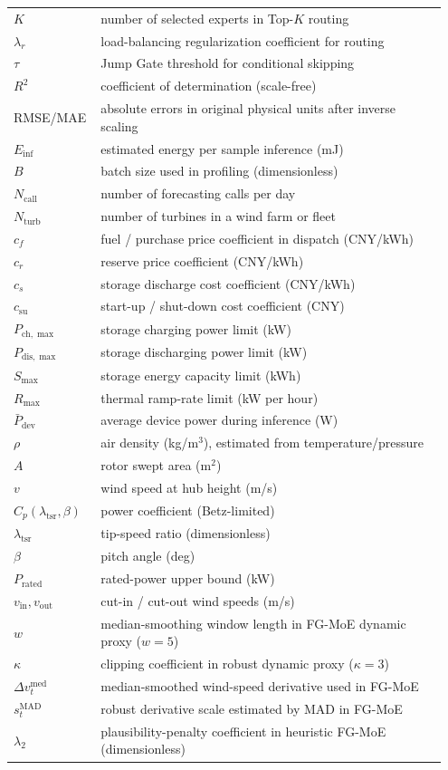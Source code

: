 \documentclass[review,1p,times]{elsarticle}
\begin{document}
\begin{longtable}{@{}p{0.17\linewidth}L{0.78\linewidth}@{}}
$K$ & number of selected experts in Top-$K$ routing \\
$\lambda_r$ & load-balancing regularization coefficient for routing \\
$\tau$ & Jump Gate threshold for conditional skipping \\
$R^2$ & coefficient of determination (scale-free) \\
RMSE/MAE & absolute errors in original physical units after inverse scaling \\
$E_{\text{inf}}$ & estimated energy per sample inference (mJ) \\
$B$ & batch size used in profiling (dimensionless) \\
$N_{\text{call}}$ & number of forecasting calls per day \\
$N_{\text{turb}}$ & number of turbines in a wind farm or fleet \\
$c_f$ & fuel / purchase price coefficient in dispatch (CNY/kWh) \\
$c_r$ & reserve price coefficient (CNY/kWh) \\
$c_s$ & storage discharge cost coefficient (CNY/kWh) \\
$c_{\text{su}}$ & start-up / shut-down cost coefficient (CNY) \\
$P_{\text{ch},\max}$ & storage charging power limit (kW) \\
$P_{\text{dis},\max}$ & storage discharging power limit (kW) \\
$S_{\max}$ & storage energy capacity limit (kWh) \\
$R_{\max}$ & thermal ramp-rate limit (kW per hour) \\
$\bar{P}_{\text{dev}}$ & average device power during inference (W) \\
$\rho$ & air density (kg/m$^3$), estimated from temperature/pressure \\
$A$ & rotor swept area (m$^2$) \\
$v$ & wind speed at hub height (m/s) \\
$C_p(\lambda_{\mathrm{tsr}},\beta)$ & power coefficient (Betz-limited) \\
$\lambda_{\mathrm{tsr}}$ & tip-speed ratio (dimensionless) \\
$\beta$ & pitch angle (deg) \\
$P_{\mathrm{rated}}$ & rated-power upper bound (kW) \\
$v_{\mathrm{in}}, v_{\mathrm{out}}$ & cut-in / cut-out wind speeds (m/s) \\
$w$ & median-smoothing window length in FG-MoE dynamic proxy ($w=5$) \\
$\kappa$ & clipping coefficient in robust dynamic proxy ($\kappa=3$) \\
$\Delta v_t^{\mathrm{med}}$ & median-smoothed wind-speed derivative used in FG-MoE \\
$s_t^{\mathrm{MAD}}$ & robust derivative scale estimated by MAD in FG-MoE \\
$\lambda_2$ & plausibility-penalty coefficient in heuristic FG-MoE (dimensionless) \\
\end{longtable}
\linenumbers
\endgroup
\end{document}
